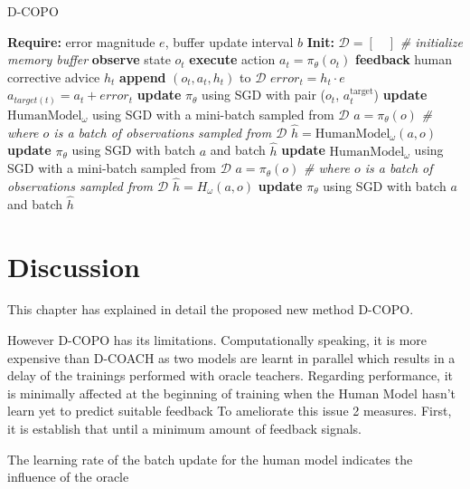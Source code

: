 \begin{algorithm}[H]
\caption{D-COPO}\label{algorithm:D-COPO}
\begin{algorithmic}[1]
\State \textbf{Require:} error magnitude $e$, buffer update interval $b$
\State \textbf{Init:} $\mathcal{D} = [\quad]$  \emph{\# initialize memory buffer}
\State \textbf{observe} state $o_{t}$
\State \textbf{execute} action $a_{t}=\pi_{\theta}(o_{t})$
\State \textbf{feedback} human corrective advice $h_{t}$
\State \textbf{append} $(o_{t}, a_{t}, h_{t})$ to $\mathcal{D}$
\State $\mathit{error}_{t} = h_{t}\cdot e$
\State $a_{target(t)} = a_{t} + \mathit{error}_{t}$
\State \textbf{update} $\pi_\theta$ using SGD with pair ($o_{t}$, $a^{\text{target}}_{t}$)
\State \textbf{update} $\text{HumanModel}_\omega$ using SGD with a mini-batch sampled from $\mathcal{D}$
\State  $a=\pi_{\theta}(o)$ \emph{\# where $o$ is a batch of observations sampled from $\mathcal{D}$}
\State  $\hat{h}=\text{HumanModel}_\omega(a, o)$
\State \textbf{update} $\pi_\theta$ using SGD with batch $a$ and batch $\hat{h}$
\EndIf
{}
\State \textbf{update} $\text{HumanModel}_\omega$ using SGD with a mini-batch sampled from $\mathcal{D}$
\State  $a=\pi_{\theta}(o)$ \emph{\# where $o$ is a batch of observations sampled from $\mathcal{D}$}
\State  $\hat{h}=H_\omega(a, o)$
\State \textbf{update} $\pi_{\theta}$ using SGD with batch $a$ and batch $\hat{h}$
\EndIf
\EndFor
\end{algorithmic}
\label{al:D-COACH with HM}
\end{algorithm}


\section{Discussion}
\label{section:Algorithm-Discussion}
This chapter has explained in detail the proposed new method D-COPO. 


However D-COPO has its limitations. Computationally speaking, it is more expensive than D-COACH as two models are learnt in parallel which results in a delay of the trainings performed with oracle teachers. Regarding performance, it is minimally affected at the beginning of training when the Human Model hasn't learn yet to predict suitable feedback 
To ameliorate this issue 2 measures. First, it is establish that until a minimum amount of feedback signals.

The learning rate of the batch update for the human model indicates the influence of the oracle